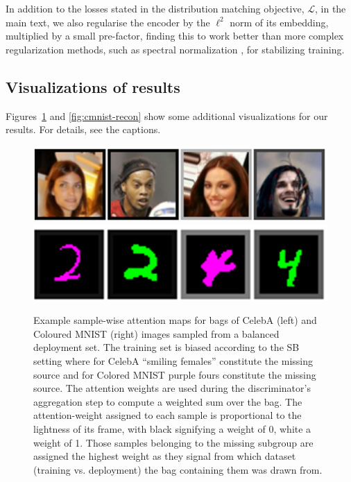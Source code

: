 In addition to the losses stated in the distribution matching objective, $\mathcal{L}$, in the main text, we also regularise the encoder by the $\ell^2$ norm of its embedding, multiplied by a small pre-factor, finding this to work better than more complex regularization methods, such as spectral normalization \citep{miyato2018spectral}, for stabilizing training.

\subsection{Visualizations of results}\label{sec:qual-results}
Figures~\ref{fig:attn_maps} and \ref{fig:cmnist-recon} show some additional visualizations for our results.
For details, see the captions.
\begin{figure}[tb]
  \centering
    \includegraphics[width=\textwidth]{figures/celeba_attn_map.png}
    \includegraphics[width=\textwidth]{figures/cmnist_attn_map.png}
  \caption{
    Example sample-wise attention maps for bags of CelebA (left) and Coloured MNIST (right) images sampled from a balanced deployment set. The training set is biased according to the SB setting where for CelebA ``smiling females'' constitute the missing source and for Colored MNIST {\color{purple}purple} fours constitute the missing source. The attention weights are used during the discriminator's aggregation step to compute a weighted sum over the bag. The attention-weight assigned to each sample is proportional to the lightness of its frame, with black signifying a weight of 0, white a weight of 1. Those samples belonging to the missing subgroup are assigned the highest weight as they signal from which dataset (training vs. deployment) the bag containing them was drawn from.
  }%
  \label{fig:attn_maps}
\end{figure}

